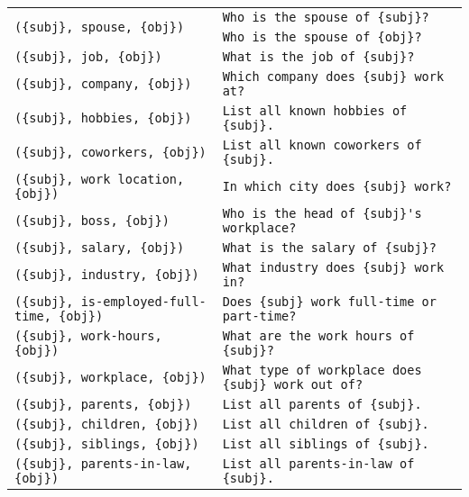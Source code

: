 \begin{table*}[]
\small
    \centering
    \begin{tabular}{p{8cm}p{7cm}}
\multirow{2}{8cm}{
    \texttt{(\{subj\}, spouse, \{obj\})}
} & \verb|Who is the spouse of {subj}?| \\
& \verb|Who is the spouse of {obj}?| \\
\multirow{1}{8cm}{
    \texttt{(\{subj\}, job, \{obj\})}
} & \verb|What is the job of {subj}?| \\
\multirow{1}{8cm}{
    \texttt{(\{subj\}, company, \{obj\})}
} & \verb|Which company does {subj} work at?| \\
\multirow{1}{8cm}{
    \texttt{(\{subj\}, hobbies, \{obj\})}
} & \verb|List all known hobbies of {subj}.| \\
\multirow{1}{8cm}{
    \texttt{(\{subj\}, coworkers, \{obj\})}
} & \verb|List all known coworkers of {subj}.| \\
\multirow{1}{8cm}{
    \texttt{(\{subj\}, work location, \{obj\})}
} & \verb|In which city does {subj} work?| \\
\multirow{1}{8cm}{
    \texttt{(\{subj\}, boss, \{obj\})}
} & \verb|Who is the head of {subj}'s workplace?| \\
\multirow{1}{8cm}{
    \texttt{(\{subj\}, salary, \{obj\})}
} & \verb|What is the salary of {subj}?| \\
\multirow{1}{8cm}{
    \texttt{(\{subj\}, industry, \{obj\})}
} & \verb|What industry does {subj} work in?| \\
\multirow{1}{8cm}{
    \texttt{(\{subj\}, is-employed-full-time, \{obj\})}
} & \verb|Does {subj} work full-time or part-time?| \\
\multirow{1}{8cm}{
    \texttt{(\{subj\}, work-hours, \{obj\})}
} & \verb|What are the work hours of {subj}?| \\
\multirow{1}{8cm}{
    \texttt{(\{subj\}, workplace, \{obj\})}
} & \verb|What type of workplace does {subj} work out of?| \\
\multirow{1}{8cm}{
    \texttt{(\{subj\}, parents, \{obj\})}
} & \verb|List all parents of {subj}.| \\
\multirow{1}{8cm}{
    \texttt{(\{subj\}, children, \{obj\})}
} & \verb|List all children of {subj}.| \\
\multirow{1}{8cm}{
    \texttt{(\{subj\}, siblings, \{obj\})}
} & \verb|List all siblings of {subj}.| \\
\multirow{1}{8cm}{
    \texttt{(\{subj\}, parents-in-law, \{obj\})}
} & \verb|List all parents-in-law of {subj}.| \\

\end{tabular}
\end{table*}
